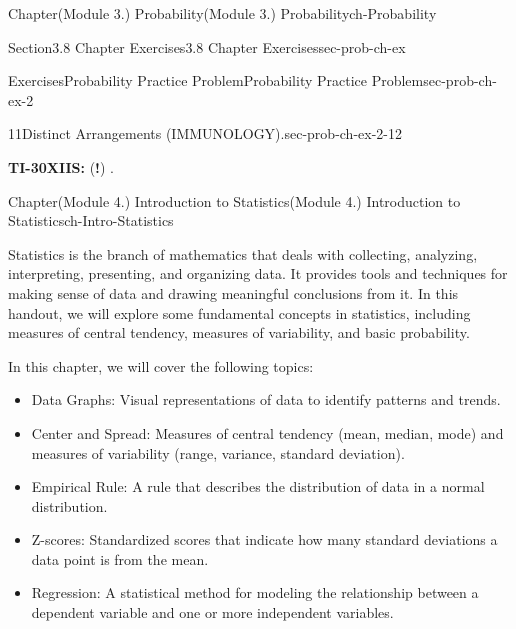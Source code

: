 \documentclass[oneside,10pt,]{book}
\newcommand{\ptxlistdisc}{\raisebox{0.3ex}{\textbullet}}
\newcommand{\terminology}[1]{\textbf{#1}}
\newcommand{\kbd}[1]{\keys{{#1}}}
\begin{document}
\begin{chapterptx}{Chapter}{(Module 3.) Probability}{}{(Module 3.) Probability}{}{}{ch-Probability}
\begin{sectionptx}{Section}{3.8 Chapter Exercises}{}{3.8 Chapter Exercises}{}{}{sec-prob-ch-ex}
\begin{exercises-subsection-numberless}{Exercises}{Probability Practice Problem}{}{Probability Practice Problem}{}{}{sec-prob-ch-ex-2}
\begin{divisionexercise}{11}{Distinct Arrangements (IMMUNOLOGY).}{}{sec-prob-ch-ex-2-12}
\begin{equation*}
\end{equation*}
%
\par
\terminology{TI-30XIIS:} \kbd{10} \kbd{PRB} (\terminology{!}) \kbd{÷} \kbd{(} \kbd{2} \kbd{PRB} \kbd{!} \kbd{×} \kbd{2} \kbd{PRB} \kbd{!} \kbd{)} \kbd{ENTER}.%
\end{divisionexercise}%
\end{exercises-subsection-numberless}
\end{sectionptx}
\end{chapterptx}
%
%
\typeout{************************************************}
\typeout{************************************************}
%
\begin{chapterptx}{Chapter}{(Module 4.) Introduction to Statistics}{}{(Module 4.) Introduction to Statistics}{}{}{ch-Intro-Statistics}
\renewcommand*{\chaptername}{Chapter}
\begin{introduction}{}%
Statistics is the branch of mathematics that deals with collecting, analyzing, interpreting, presenting, and organizing data. It provides tools and techniques for making sense of data and drawing meaningful conclusions from it. In this handout, we will explore some fundamental concepts in statistics, including measures of central tendency, measures of variability, and basic probability.%
\par
In this chapter, we will cover the following topics:%
\begin{itemize}[label=\ptxlistdisc]
\item{}Data Graphs: Visual representations of data to identify patterns and trends.%
\item{}Center and Spread: Measures of central tendency (mean, median, mode) and measures of variability (range, variance, standard deviation).%
\item{}Empirical Rule: A rule that describes the distribution of data in a normal distribution.%
\item{}Z-scores: Standardized scores that indicate how many standard deviations a data point is from the mean.%
\item{}Regression: A statistical method for modeling the relationship between a dependent variable and one or more independent variables.%
\end{itemize}
%
\end{introduction}%
%
%
\typeout{************************************************}
\typeout{************************************************}

\end{chapterptx}
\end{document}
